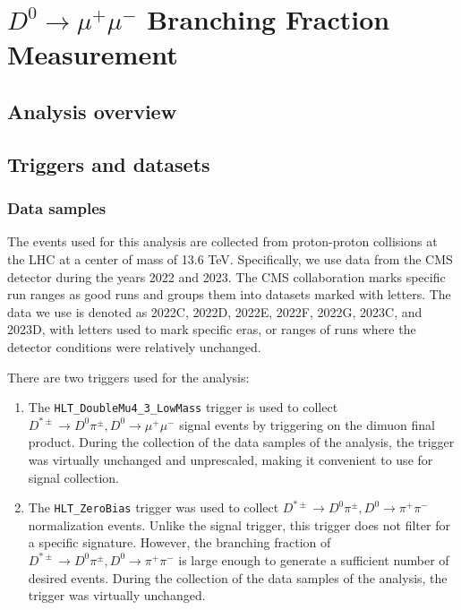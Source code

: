 \chapter{$D^0 \to \mu^+\mu^-$ Branching Fraction Measurement}
\label{ch:4}

\section{Analysis overview}

\label{sec:analysis_overview}


\section{Triggers and datasets}

\subsection{Data samples}

\label{subsec:data_samples}

The events used for this analysis are collected from proton-proton collisions at the LHC at a center of mass of 13.6 TeV. Specifically, we use data from the CMS detector during the years 2022 and 2023. The CMS collaboration marks specific run ranges as good runs and groups them into datasets marked with letters. The data we use is denoted as 2022C, 2022D, 2022E, 2022F, 2022G, 2023C, and 2023D, with letters used to mark specific eras, or ranges of runs where the detector conditions were relatively unchanged. 

There are two triggers used for the analysis:
\begin{enumerate}
    \item The \texttt{HLT\_DoubleMu4\_3\_LowMass} trigger is used to collect $D^{*\pm} \to D^0 \pi^\pm, D^0 \to \mu^+ \mu^-$ signal events by triggering on the dimuon final product. During the collection of the data samples of the analysis, the trigger was virtually unchanged and unprescaled, making it convenient to use for signal collection.
    \item The \texttt{HLT\_ZeroBias} trigger was used to collect $D^{*\pm} \to D^0 \pi^\pm, D^0 \to \pi^+ \pi^-$ normalization events. Unlike the signal trigger, this trigger does not filter for a specific signature. However, the branching fraction of $D^{*\pm} \to D^0 \pi^\pm, D^0 \to \pi^+ \pi^-$ is large enough to generate a sufficient number of desired events. During the collection of the data samples of the analysis, the trigger was virtually unchanged.
\end{enumerate}

